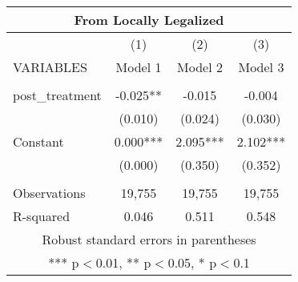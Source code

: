 \begin{tabular}{lccc}
\multicolumn{4}{c}{From Locally Legalized} \\ \hline
 & (1) & (2) & (3) \\
VARIABLES & Model 1 & Model 2 & Model 3 \\ \hline
 &  &  &  \\
post\_treatment & -0.025** & -0.015 & -0.004 \\
 & (0.010) & (0.024) & (0.030) \\
Constant & 0.000*** & 2.095*** & 2.102*** \\
 & (0.000) & (0.350) & (0.352) \\
 &  &  &  \\
Observations & 19,755 & 19,755 & 19,755 \\
 R-squared & 0.046 & 0.511 & 0.548 \\ \hline
\multicolumn{4}{c}{ Robust standard errors in parentheses} \\
\multicolumn{4}{c}{ *** p$<$0.01, ** p$<$0.05, * p$<$0.1} \\
\end{tabular}
